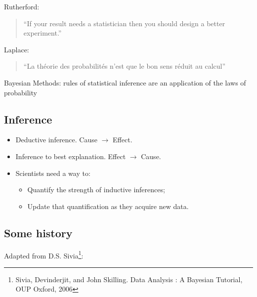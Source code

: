 \documentclass[%
oneside,                 %
final,                   %
10pt]{article}
\newenvironment{block_mdfboxadmon}[1][]{
\begin{block_mdfboxmdframed}[frametitle=#1]
}
{
\end{block_mdfboxmdframed}
}
\begin{document}


\begin{block_mdfboxadmon}[]
Rutherford:

\begin{quote}
“If your result needs a statistician then you should design a better experiment.”
\end{quote}
\end{block_mdfboxadmon} %




\begin{block_mdfboxadmon}[]
Laplace:

\begin{quote}
“La théorie des probabilités n'est que le bon sens réduit au calcul”
\end{quote}
\end{block_mdfboxadmon} %



Bayesian Methods: rules of statistical inference are an application of the laws of probability


\subsection{Inference}
\begin{itemize}
 \item Deductive inference. Cause $\to$ Effect. 

 \item Inference to best explanation. Effect $\to$ Cause. 

 \item Scientists need a way to:
\begin{itemize}

    \item Quantify the strength of inductive inferences;

    \item Update that quantification as they acquire new data.
\end{itemize}

\noindent
\end{itemize}

\noindent

\subsection{Some history}
Adapted from D.S. Sivia\footnote{Sivia, Devinderjit, and John Skilling. Data Analysis : A Bayesian Tutorial, OUP Oxford, 2006}:
\end{document}
